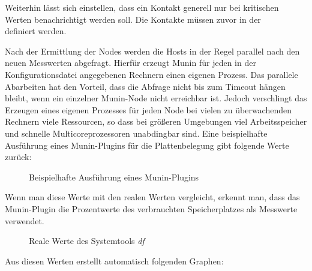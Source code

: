 Weiterhin lässt sich einstellen, dass ein Kontakt generell nur bei kritischen Werten benachrichtigt werden soll.
Die Kontakte müssen zuvor in der \\  definiert werden.

Nach der Ermittlung der Nodes werden die Hosts in der Regel parallel nach den neuen Messwerten abgefragt.
Hierfür erzeugt Munin  für jeden in der Konfigurationsdatei angegebenen Rechnern einen eigenen Prozess.
Das parallele Abarbeiten hat den Vorteil, dass die Abfrage nicht bis zum Timeout hängen bleibt, wenn ein einzelner Munin-Node nicht erreichbar ist.
Jedoch verschlingt das Erzeugen eines eigenen Prozesses für jeden Node bei vielen zu überwachenden Rechnern viele Ressourcen, so dass bei größeren Umgebungen viel Arbeitsspeicher und schnelle Multicoreprozessoren unabdingbar sind.
Eine beispielhafte Ausführung eines Munin-Plugins für die Plattenbelegung gibt folgende Werte zurück:

\begin{figure}[ht]
	\centering
		\caption{Beispielhafte Ausführung eines Munin-Plugins}
		\label{df-munin}
\end{figure}
\newpage
Wenn man diese Werte mit den realen Werten vergleicht, erkennt man, dass das Munin-Plugin die Prozentwerte des verbrauchten Speicherplatzes als Messwerte verwendet.

\begin{figure}[ht]
	\centering
		\caption{Reale Werte des Systemtools \textit{df}}
		\label{df}
\end{figure}

Aus diesen Werten erstellt  automatisch folgenden Graphen:

